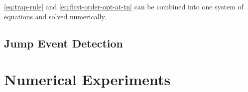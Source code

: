 \documentclass[twoside,leqno,twocolumn]{article}
\begin{document}
\eqref{eq:trap-rule} and \eqref{eq:first-order-opt-at-tn} can be combined into one system of equations and solved numerically.

\subsection{Jump Event Detection}

\section{Numerical Experiments}

\printbibliography
\end{document}
